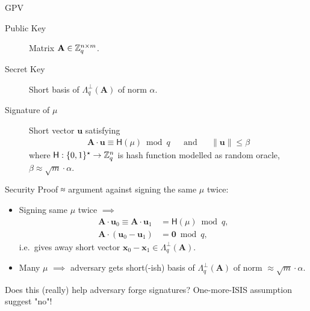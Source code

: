 \documentclass[xcolor=table,10pt,aspectratio=169]{beamer}
\renewcommand{\vec}[1]{\ensuremath{\mathbf{#1}}\xspace}
\newcommand{\norm}[1]{\left\lVert#1\right\rVert}
\providecommand{\mat}[1]{\ensuremath{\vec{#1}}\xspace}
\begin{document}
\begin{frame}[label={sec:org80cb119}]{GPV}
\begin{description}
\item[{Public Key}] Matrix \(\mat{A} \in \ZZ_q^{n \times m}\).
\item[{Secret Key}] Short basis of \(\Lambda_q^\bot(\mat{A})\) of norm \(\alpha\).
\item[{Signature of \(\mu\)}] Short vector \(\vec{u}\) satisfying
\[\begin{aligned}
  \mat{A} \cdot \vec{u} \equiv \mathsf{H}(\mu) \bmod q && \text{and} && \norm{\vec{u}} \leq \beta
  \end{aligned}\]
where \(\mathsf{H}: \{0,1\}^{\star} \to \mathbb{Z}_q^n\) is hash function modelled as random oracle, \(\beta \approx \sqrt{m} \cdot \alpha\).
\end{description}
\end{frame}

\begin{frame}[label={sec:orge962a5f}]{Security Proof ≈ argument against signing the same \(\mu\) twice:}
\begin{itemize}
\item Signing same \(\mu\) twice \(\implies\)
\[\begin{aligned}
  \mat{A} \cdot \vec{u}_0 \equiv \mat{A} \cdot \vec{u}_1 &= \mathsf{H}(\mu) \bmod q, \\
  \mat{A} \cdot (\vec{u}_0 - \vec{u}_1) &= \vec{0} \bmod q,
  \end{aligned}\]
i.e. gives away short vector \(\vec{x}_0 - \vec{x}_1 \in \Lambda_q^\bot(\mat{A})\).
\item Many \(\mu\) \(\implies\) adversary gets short(-ish) basis of \(\Lambda_q^\bot(\mat{A})\) of norm \(\approx \sqrt{m} \cdot \alpha\).
\end{itemize}

\begin{alertblock}{Does this (really) help adversary forge signatures?}
One-more-ISIS assumption suggest "no"!
\end{alertblock}
\end{frame}
\end{document}
